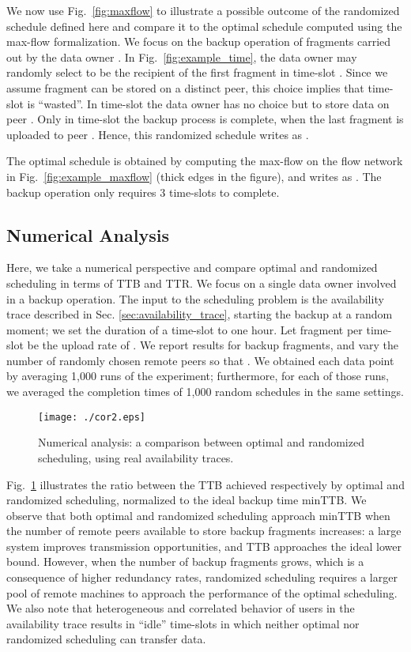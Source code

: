 \documentclass[conference,10pt]{IEEEtran}
\begin{document}
We now use Fig.~\ref{fig:maxflow} to illustrate a possible outcome of
the randomized schedule defined here and compare it to the optimal
schedule computed using the max-flow formalization. We focus on the
backup operation of  fragments carried out by the data owner
. In Fig.~\ref{fig:example_time}, the data owner may randomly
select  to be the recipient of the first fragment in time-slot
. Since we assume  fragment can be stored on a distinct
peer, this choice implies that time-slot  is ``wasted''. In
time-slot  the data owner has no choice but to store data on peer
. Only in time-slot  the backup process is complete, when
the last fragment is uploaded to peer . Hence, this randomized
schedule writes as .

The optimal schedule is obtained by computing the max-flow on the flow network in Fig.~\ref{fig:example_maxflow} (thick edges in the figure), and writes as . The backup operation only requires 3 time-slots to complete.

\subsection{Numerical Analysis} \label{sec:simple_sim}

Here, we take a numerical perspective and compare optimal
and randomized scheduling in terms of TTB and TTR. We focus on a
single data owner  involved in a backup operation.  The input to
the scheduling problem is the availability trace described in
Sec. \ref{sec:availability_trace}, starting the backup at a random
moment; we set the duration of a time-slot to one hour. Let 
fragment per time-slot be the upload rate of . We report results
for  backup fragments, and vary the number of
randomly chosen remote peers so that . We obtained each data point by averaging
1,000 runs of the experiment; furthermore, for each of those runs, we
averaged the completion times of 1,000 random schedules in the same
settings.

\begin{figure}
	\centering
	\texttt{[image: ./cor2.eps]} 
	\caption{Numerical analysis: a comparison between optimal and randomized scheduling, using real availability traces.} \label{fig:ineff} 
\end{figure}

Fig.~\ref{fig:ineff} illustrates the ratio between the TTB achieved
respectively by optimal and randomized scheduling, normalized to the
ideal backup time minTTB. We observe that both optimal and randomized
scheduling approach minTTB when the number of remote peers available
to store backup fragments increases: a large system improves
transmission opportunities, and TTB approaches the ideal lower
bound. However, when the number of backup fragments grows, which is a
consequence of higher redundancy rates, randomized scheduling requires
a larger pool of remote machines to approach the performance of the
optimal scheduling. We also note that heterogeneous and correlated
behavior of users in the availability trace results in ``idle''
time-slots in which neither optimal nor randomized scheduling can
transfer data.
\end{document}
